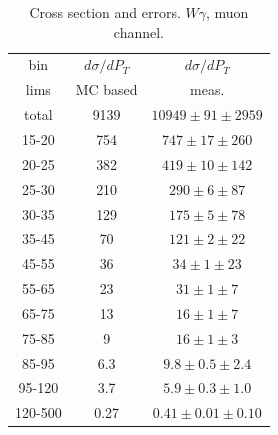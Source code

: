 \begin{table}[h]
  \scriptsize
  \begin{center}
  \caption{Cross section and errors. $W\gamma$, muon channel.}
  \begin{tabular}{|c|c|c|}
    bin & $d\sigma/dP_{T}$ &$d\sigma/dP_{T}$ \\ 
    lims & MC based &    meas.       \\ \hline
    total & 9139 & $10949 \pm 91 \pm 2959$ \\ \hline
    15-20 & 754 & $747 \pm 17 \pm 260$ \\ \hline
    20-25 & 382 & $419 \pm 10 \pm 142$ \\ \hline
    25-30 & 210 & $290 \pm 6 \pm 87$ \\ \hline
    30-35 & 129 & $175 \pm 5 \pm 78$ \\ \hline
    35-45 & 70 & $121 \pm 2 \pm 22$ \\ \hline
    45-55 & 36 & $34 \pm 1 \pm 23$ \\ \hline
    55-65 & 23 & $31 \pm 1 \pm 7$ \\ \hline
    65-75 & 13 & $16 \pm 1 \pm 7$ \\ \hline
    75-85 & 9 & $16 \pm 1 \pm 3$ \\ \hline
    85-95 & 6.3 & $9.8 \pm 0.5 \pm 2.4$ \\ \hline
    95-120 & 3.7 & $5.9 \pm 0.3 \pm 1.0$ \\ \hline
    120-500 & 0.27 & $0.41 \pm 0.01 \pm 0.10$ \\ \hline
  \end{tabular}
  \label{tab:sc_mc_vs_meas_MUON_WGamma}
  \end{center}
\end{table}

